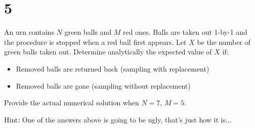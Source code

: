 \documentclass{article}
\begin{document}
\section*{5}
\begin{ques}\label{q5}
    An urn contains $N$ green balls and $M$ red ones. Balls are taken out 1-by-1 and the procedure is stopped when a red ball first appears. Let $X$ be the number of green balls taken out. Determine analytically the expected value of $X$ if:
    \begin{itemize}
        \item[a)] Removed balls are returned back (sampling with replacement)
        \item[b)] Removed balls are gone (sampling without replacement)
    \end{itemize}
    Provide the actual numerical solution when $N=7$, $M=5$.

    Hint: One of the answers above is going to be ugly, that's just how it is...
\end{ques}
\end{document}
